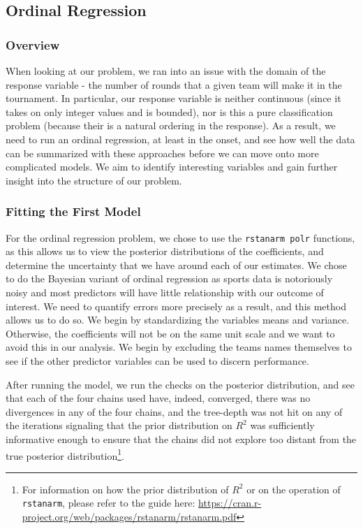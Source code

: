 \documentclass[10pt,a4paper, hidelinks]{article} %
\begin{document}
\subsection{Ordinal Regression}
\subsubsection{Overview}
When looking at our problem, we ran into an issue with the domain of the response variable - the number of rounds that a given team will make it in the tournament. In particular, our response variable is neither continuous (since it takes on only integer values and is bounded), nor is this a pure classification problem (because their is a natural ordering in the response). As a result, we need to run an ordinal regression, at least in the onset, and see how well the data can be summarized with these approaches before we can move onto more complicated models. We aim to identify interesting variables and gain further insight into the structure of our problem.  

\subsubsection{Fitting the First Model}
For the ordinal regression problem, we chose to use the \texttt{rstanarm polr} functions, as this allows us to view the posterior distributions of the coefficients, and determine the uncertainty that we have around each of our estimates. We chose to do the Bayesian variant of ordinal regression as sports data is notoriously noisy and most predictors will have little relationship with our outcome of interest. We need to quantify errors more precisely as a result, and this method allows us to do so. We begin by standardizing the variables means and variance. Otherwise, the coefficients will not be on the same unit scale and we want to avoid this in our analysis. We begin by excluding the teams names themselves to see if the other predictor variables can be used to discern performance. 

After running the model, we run the checks on the posterior distribution, and see that each of the four chains used have, indeed, converged, there was no divergences in any of the four chains, and the tree-depth was not hit on any of the iterations signaling that the prior distribution on $R^2$ was sufficiently informative enough to ensure that the chains did not explore too distant from the true posterior distribution\footnote{For information on how the prior distribution of $R^2$ or on the operation of \texttt{rstanarm}, please refer to the guide here: {\color{blue} \url{https://cran.r-project.org/web/packages/rstanarm/rstanarm.pdf}}}. 
\end{document}
